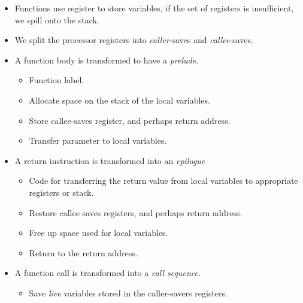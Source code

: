 \begin{itemize}

\item Functions use register to store variables, if the set of registers is
insufficient, we spill onto the stack.

\item We split the processor registers into \emph{caller}-saves and
\emph{callee}-saves.

\item A function body is transformed to have a \emph{prelude}.

\begin{itemize}

\item Function label.

\item Allocate space on the stack of the local variables.

\item Store callee-saves register, and perhaps return address.

\item Transfer parameter to local variables.

\end{itemize}

\item A return instruction is transformed into an \emph{epilogue}

\begin{itemize}

\item Code for transferring the return value from local variables to
appropriate registers or stack.

\item Restore callee saves registers, and perhaps return address.

\item Free up space used for local variables.

\item Return to the return address.

\end{itemize}

\item A function call is transformed into a \emph{call sequence}.

\begin{itemize}

\item Save \emph{live} variables stored in the caller-savers registers.


\end{itemize}
\end{itemize}
